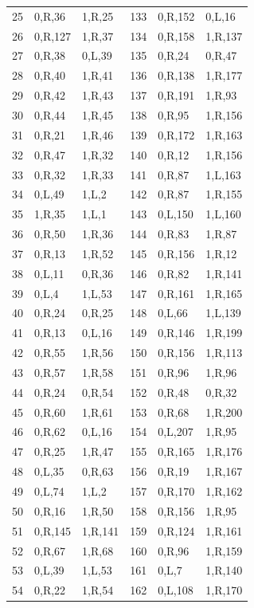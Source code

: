 \begin{longtable}{rll@{\hspace{12mm}}rll}
25 & 0,R,36 & 1,R,25 & 133 & 0,R,152 & 0,L,16\\
26 & 0,R,127 & 1,R,37 & 134 & 0,R,158 & 1,R,137\\
27 & 0,R,38 & 0,L,39 & 135 & 0,R,24 & 0,R,47\\
28 & 0,R,40 & 1,R,41 & 136 & 0,R,138 & 1,R,177\\
29 & 0,R,42 & 1,R,43 & 137 & 0,R,191 & 1,R,93\\
30 & 0,R,44 & 1,R,45 & 138 & 0,R,95 & 1,R,156\\
31 & 0,R,21 & 1,R,46 & 139 & 0,R,172 & 1,R,163\\
32 & 0,R,47 & 1,R,32 & 140 & 0,R,12 & 1,R,156\\
33 & 0,R,32 & 1,R,33 & 141 & 0,R,87 & 1,L,163\\
34 & 0,L,49 & 1,L,2 & 142 & 0,R,87 & 1,R,155\\
35 & 1,R,35 & 1,L,1 & 143 & 0,L,150 & 1,L,160\\
36 & 0,R,50 & 1,R,36 & 144 & 0,R,83 & 1,R,87\\
37 & 0,R,13 & 1,R,52 & 145 & 0,R,156 & 1,R,12\\
38 & 0,L,11 & 0,R,36 & 146 & 0,R,82 & 1,R,141\\
39 & 0,L,4 & 1,L,53 & 147 & 0,R,161 & 1,R,165\\
40 & 0,R,24 & 0,R,25 & 148 & 0,L,66 & 1,L,139\\
41 & 0,R,13 & 0,L,16 & 149 & 0,R,146 & 1,R,199\\
42 & 0,R,55 & 1,R,56 & 150 & 0,R,156 & 1,R,113\\
43 & 0,R,57 & 1,R,58 & 151 & 0,R,96 & 1,R,96\\
44 & 0,R,24 & 0,R,54 & 152 & 0,R,48 & 0,R,32\\
45 & 0,R,60 & 1,R,61 & 153 & 0,R,68 & 1,R,200\\
46 & 0,R,62 & 0,L,16 & 154 & 0,L,207 & 1,R,95\\
47 & 0,R,25 & 1,R,47 & 155 & 0,R,165 & 1,R,176\\
48 & 0,L,35 & 0,R,63 & 156 & 0,R,19 & 1,R,167\\
49 & 0,L,74 & 1,L,2 & 157 & 0,R,170 & 1,R,162\\
50 & 0,R,16 & 1,R,50 & 158 & 0,R,156 & 1,R,95\\
51 & 0,R,145 & 1,R,141 & 159 & 0,R,124 & 1,R,161\\
52 & 0,R,67 & 1,R,68 & 160 & 0,R,96 & 1,R,159\\
53 & 0,L,39 & 1,L,53 & 161 & 0,L,7 & 1,R,140\\
54 & 0,R,22 & 1,R,54 & 162 & 0,L,108 & 1,R,170\\

\end{longtable}
